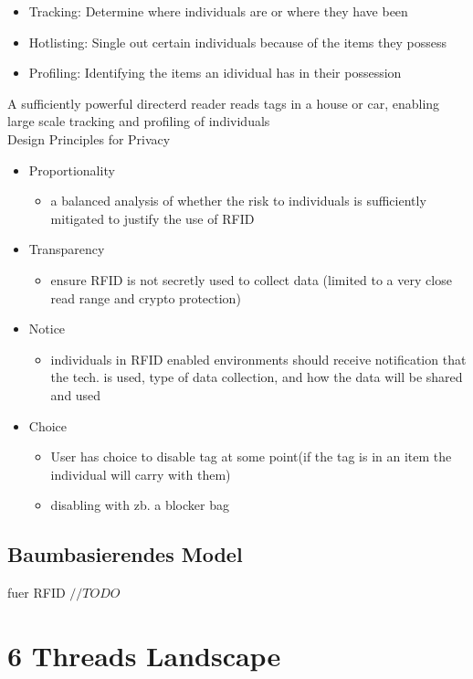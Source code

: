 \documentclass[a4paper, 12pt]{article}
\begin{document}
\begin{itemize}
\item Tracking: Determine where individuals are or where they have been
\item Hotlisting: Single out certain individuals because of the items they possess
\item Profiling: Identifying the items an idividual has in their possession
\end{itemize}
A sufficiently powerful directerd reader reads tags in a house or car, enabling large scale tracking and profiling of individuals \\ \newline
\large Design Principles for Privacy
\begin{itemize}
\item Proportionality
\begin{itemize}
\item a balanced analysis of whether the risk to individuals is sufficiently mitigated to justify the use of RFID
\end{itemize}
\item Transparency
\begin{itemize}
\item ensure RFID is not secretly used to collect data (limited to a very close read range and crypto protection)
\end{itemize}
\item Notice
\begin{itemize}
\item individuals in RFID enabled environments should receive notification that the tech. is used, type of data collection, and how the data will be shared and used
\end{itemize}
\item Choice
\begin{itemize}
\item User has choice to disable tag at some point(if the tag is in an item the individual will carry with them)
\item disabling with zb. a blocker bag
\end{itemize}
\end{itemize}


\subsection{Baumbasierendes Model}
fuer RFID
$ //TODO $


\section{6 Threads Landscape}
\end{document}

